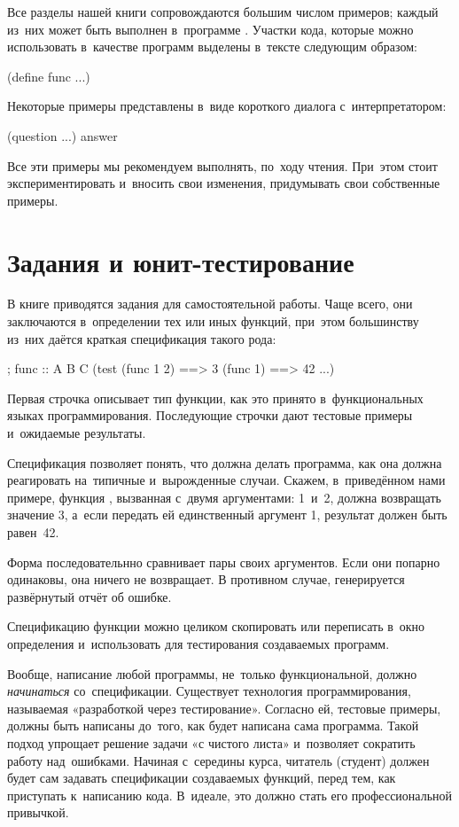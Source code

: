 Все разделы нашей книги сопровождаются большим числом примеров; каждый из~них может быть выполнен в~программе . Участки кода, которые можно использовать в~качестве программ выделены в~тексте следующим образом:

\begin{Definition}
(define func
 ...)
\end{Definition}

Некоторые примеры представлены в~виде короткого диалога с~интерпретатором:

\REPL
  {(question ...)}
  {answer}

Все эти примеры мы рекомендуем выполнять, по~ходу чтения. При~этом стоит экспериментировать и~вносить свои изменения, придумывать свои собственные примеры.

\section{Задания и юнит-тестирование}%
В книге приводятся задания для самостоятельной работы. Чаще всего, они заключаются в~определении тех или иных функций, при~этом большинству из~них даётся краткая спецификация такого рода:

\begin{Specification}
; func :: A B \arrow C
(test 
  (func 1 2)  ==> 3
  (func 1)    ==> 42
  ...)
\end{Specification}

\noindent Первая строчка описывает тип функции, как это принято в~функциональных языках программирования. Последующие строчки дают тестовые примеры и~ожидаемые результаты. 

Спецификация позволяет понять, что должна делать программа, как она должна реагировать на~типичные и~вырожденные случаи. Скажем, в~приведённом нами примере, функция , вызванная с~двумя аргументами: 1~и~2, должна возвращать значение 3, а~если передать ей единственный аргумент 1, результат должен быть равен~42.

Форма   последовательнно сравнивает пары своих аргументов. Если они попарно одинаковы, она ничего не возвращает. В противном случае, генерируется развёрнутый отчёт об ошибке.

Спецификацию функции можно целиком скопировать или переписать в~окно определения  и~использовать для тестирования создаваемых программ.

Вообще, написание любой программы, не~только функциональной, должно \emph{начинаться} со~спецификации. Существует технология программирования, называемая «разработкой через тестирование». Согласно ей, тестовые примеры, должны быть написаны до~того, как будет написана сама программа. Такой подход упрощает решение задачи «с чистого листа» и~позволяет сократить работу над~ошибками. Начиная с~середины курса, читатель (студент) должен будет сам задавать спецификации создаваемых функций, перед тем, как приступать к~написанию кода. В~идеале, это должно стать его профессиональной привычкой.

